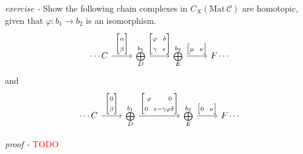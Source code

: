 \documentclass[11pt]{article}
\theoremstyle{definition}
\begin{document}
    \emph{exercise - } Show the following chain complexes in \(C_X(\text{Mat}\,\mathcal{C})\) are homotopic, given that \(\varphi: b_1 \to b_2\) is an isomorphism.
    \begin{equation*}
        \begin{tikzcd}
            \cdots C \arrow[r,"{\begin{bmatrix} \alpha\\ \beta \end{bmatrix}}"] &\substack{b_1\\ \bigoplus \\ D} \arrow[r,"{\begin{bmatrix} \varphi \;\;\; \delta \\ \gamma \;\;\; \epsilon \end{bmatrix}}"] &\substack{b_2\\ \bigoplus \\ E} \arrow[r,"{\begin{bmatrix} \mu\;\;\;\nu \end{bmatrix}}"] &F \cdots
        \end{tikzcd}
    \end{equation*}
    and
    \begin{equation*}
        \begin{tikzcd}
            \cdots C \arrow[r,"{\begin{bmatrix} 0\\ \beta \end{bmatrix}}"] &\substack{b_1\\ \bigoplus \\ D} \arrow[rr,"{\begin{bmatrix} \varphi \quad\quad 0 \\ 0 \;\;\; \epsilon-\gamma \varphi \delta \end{bmatrix}}"] &&\substack{b_2\\ \bigoplus \\ E} \arrow[r,"{\begin{bmatrix} 0\;\;\;\nu \end{bmatrix}}"] &F \cdots
        \end{tikzcd}
    \end{equation*}

    \emph{proof - } \textcolor{red}{TODO}


\end{document}

